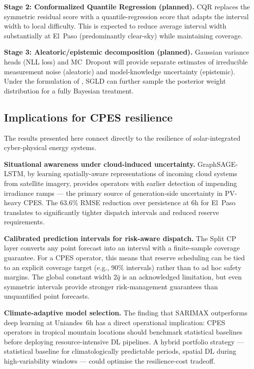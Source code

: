 \textbf{Stage 2: Conformalized Quantile Regression (planned).}
CQR \cite{romano2019} replaces the symmetric residual score with a
quantile-regression score that adapts the interval width to local difficulty.
This is expected to reduce average interval width substantially at El~Paso
(predominantly clear-sky) while maintaining coverage.

\textbf{Stage 3: Aleatoric/epistemic decomposition (planned).}
Gaussian variance heads (NLL loss) and MC~Dropout will provide separate
estimates of irreducible measurement noise (aleatoric) and model-knowledge
uncertainty (epistemic). Under the formulation of \cite{kendall2017}, SGLD
\cite{welling2011} can further sample the posterior weight distribution for a
fully Bayesian treatment.

\subsection{Implications for CPES resilience}

The results presented here connect directly to the resilience of solar-integrated
cyber-physical energy systems.

\textbf{Situational awareness under cloud-induced uncertainty.}
GraphSAGE-LSTM, by learning spatially-aware representations of incoming cloud
systems from satellite imagery, provides operators with earlier detection of
impending irradiance ramps --- the primary source of generation-side uncertainty
in PV-heavy CPES. The 63.6\% RMSE reduction over persistence at 6h for El~Paso
translates to significantly tighter dispatch intervals and reduced reserve
requirements.

\textbf{Calibrated prediction intervals for risk-aware dispatch.}
The Split CP layer converts any point forecast into an interval with a
finite-sample coverage guarantee. For a CPES operator, this means that reserve
scheduling can be tied to an explicit coverage target (e.g., 90\% intervals)
rather than to ad hoc safety margins. The global constant width $2\hat{q}$ is
an acknowledged limitation, but even symmetric intervals provide stronger
risk-management guarantees than unquantified point forecasts.

\textbf{Climate-adaptive model selection.}
The finding that SARIMAX outperforms deep learning at Uniandes~6h has a direct
operational implication: CPES operators in tropical mountain locations should
benchmark statistical baselines before deploying resource-intensive DL pipelines.
A hybrid portfolio strategy --- statistical baseline for climatologically
predictable periods, spatial DL during high-variability windows --- could
optimise the resilience-cost tradeoff.

